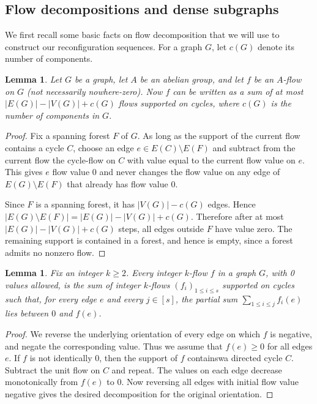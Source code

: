 \documentclass[a4paper,12pt]{article}
\theoremstyle{plain}
\newtheorem{lem}[theorem]{Lemma}
\theoremstyle{definition}
\renewcommand\le\leqslant
\renewcommand\ge\geqslant
\begin{document}
\subsection{Flow decompositions and dense subgraphs}

We first recall some basic facts on flow decomposition that we will use to construct our reconfiguration sequences. For a graph $G$, let $c(G)$ denote its number of components.

\begin{lem}
\label{decompose-flow-lem}
Let $G$ be a graph, let $A$ be an abelian group, and let $f$ be an $A$-flow on $G$ (not necessarily nowhere-zero).
Now $f$ can be written as a sum of at most $|E(G)|-|V(G)|+c(G)$ flows supported on cycles, where $c(G)$ is the number of components in $G$.
\end{lem}

\begin{proof}
Fix a spanning forest $F$ of $G$. As long as the support of the current flow contains a cycle $C$, choose an edge
$e\in E(C)\setminus E(F)$ and subtract from the current flow the cycle-flow on $C$ with value equal to the current flow value on $e$.
This gives $e$ flow value 0 and never changes the flow value on any edge of
$E(G)\setminus E(F)$ that already has flow value $0$.

Since $F$ is a spanning forest, it has $|V(G)|-c(G)$ edges. Hence
$|E(G)\setminus E(F)|=|E(G)|-|V(G)|+c(G)$.
Therefore after at most $|E(G)|-|V(G)|+c(G)$ steps, all edges outside $F$ have value zero.
The remaining support is contained in a forest, and hence is empty, since a forest admits no nonzero flow.
\end{proof}

\begin{lem}
    \label{decompose-flow-lem-II}
    Fix an integer $k\ge 2$.  Every integer $k$-flow $f$ in a graph $G$, with 0 values allowed, is the sum of integer $k$-flows $(f_i)_{1\le i\le s}$ supported on cycles such that, for every edge $e$ and every $j\in[s]$, the partial sum
    $
        \sum_{1\le i\le j} f_i(e)
    $
    lies between $0$ and $f(e)$.
\end{lem}
\begin{proof}
    We reverse the underlying orientation of every edge on which $f$ is negative, and negate the corresponding value.  Thus we assume that $f(e)\ge 0$ for all edges $e$.  If $f$ is not identically 0, then the support of $f$ containswa directed cycle $C$.  Subtract the unit flow on $C$ and repeat.  The values on each edge decrease monotonically from $f(e)$ to $0$. Now reversing all edges with initial flow value negative gives the desired decomposition for the original orientation.
\end{proof}
\end{document}
